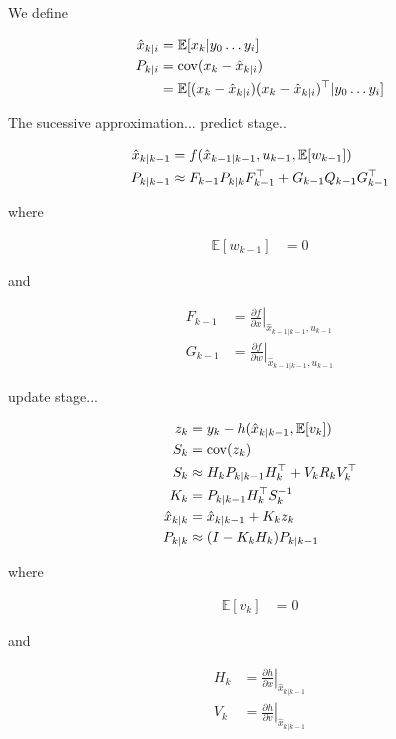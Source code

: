 \documentclass[]{article}
\begin{document}
{We define

\begin{align}
	\hat{x}_{k|i} &= \mathbb{E}[x_k|y_0 \hdots y_i] \\
	P_{k|i} &= \operatorname{cov}(x_k - \hat{x}_{k|i}) \notag \\
			&= \mathbb{E}[ (x_k-\hat{x}_{k|i}) (x_k-\hat{x}_{k|i})^\top | y_0 \hdots y_i]
\end{align}

The sucessive approximation... predict stage..

\begin{align}
	\hat{x}_{k|k-1} &= f(\hat{x}_{k-1|k-1}, u_{k-1}, \mathbb{E}[w_{k-1}]) \notag \\
	P_{k|k-1} 		&\approx F_{k-1} P_{k|k} F_{k-1}^\top + G_{k-1} Q_{k-1} G_{k-1}^\top
	\label{eqn:predict}
\end{align}

where

\begin{align}
	\mathbb{E}[w_{k-1}] &= 0
\end{align}

and

\begin{align}
	F_{k-1} &= \left . \frac{\partial f}{\partial x} \right \vert _{\hat{x}_{k-1|k-1},u_{k-1}} \\
	G_{k-1} &= \left . \frac{\partial f}{\partial w} \right \vert _{\hat{x}_{k-1|k-1},u_{k-1}}
\end{align}

update stage...

\begin{align}
	z_k 		&= y_k - h(\hat{x}_{k|k-1}, \mathbb{E}[v_k]) \\
	S_k 			&= \operatorname{cov}(z_k) \notag \\
	S_k 			&\approx H_k P_{k|k-1} H_k^\top + V_k R_k V_k^\top \\
	K_k 			&= P_{k|k-1} H_k^\top S_k^{-1} \\
	\hat{x}_{k|k} 	&= \hat{x}_{k|k-1} + K_k z_k \\
	P_{k|k} 		&\approx (I - K_k H_k) P_{k|k-1}
\end{align}

where

\begin{align}
	\mathbb{E}[v_k] &= 0
\end{align}

and

\begin{align}
	H_{k} &= \left . \frac{\partial h}{\partial x} \right \vert _{\hat{x}_{k|k-1}} \\
	V_{k} &= \left . \frac{\partial h}{\partial v} \right \vert _{\hat{x}_{k|k-1}}
\end{align}



}
\end{document}
